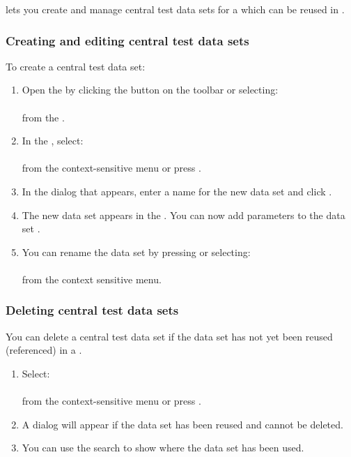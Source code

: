 \gd{} lets you create and manage central test data sets for a \gdproject{} which can be reused in \gdcases{}. 

\subsubsection{Creating and editing central test data sets}
\label{TasksCentralDataCreate}

To create a central test data set:
\begin{enumerate}
\item Open the  \gddataeditor{} by clicking the  button on the toolbar or selecting:\\
\\
from the \gdtestsuitebrowser{}.
\item In the \gddataeditor{}, select:\\
\\
from the context-sensitive menu or press .
\item In the dialog that appears, enter a name for the new data set and click .
\item The new data set appears in the \gddataeditor{}. You can now add parameters to the data set .
\item You can rename the data set by pressing or selecting:\\
\\
from the context sensitive menu.
\end{enumerate}

\subsubsection{Deleting central test data sets}
You can delete a central test data set if the data set has not yet been reused (referenced) in a \gdcase{} . 
\begin{enumerate}
\item Select:\\
\\
from the context-sensitive menu or press .

\item A dialog will appear if the data set has been reused and cannot be deleted.
\item You can use the search  to show where the data set has been used.
\end{enumerate}

